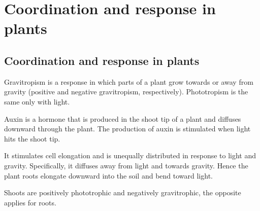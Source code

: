 \section{Coordination and response in plants}
\subsection{Coordination and response in plants}
Gravitropism is a response in which parts of a plant grow towards or away from gravity (positive
and negative gravitropism, respectively). Phototropism is the same only with light.

Auxin is a hormone that is produced in the shoot tip of a plant and diffuses downward through the
plant. The production of auxin is stimulated when light hits the shoot tip.

It stimulates cell elongation and is unequally distributed in response to light and gravity.
Specifically, it diffuses away from light and towards gravity. Hence the plant roots elongate 
downward
into the soil and bend toward light.

Shoots are positively phototrophic and negatively gravitrophic, the opposite applies for roots.
